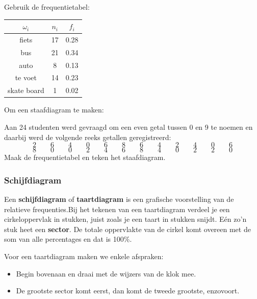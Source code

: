 \documentclass[12pt,twoside]{article}
\begin{document}
\begin{oefening}

\begin{minipage}{0.4\textwidth}
Gebruik de frequentietabel:
\begin{center}
  \begin{tabular}{c|c|c}
    $\omega_i$ & $n_i$ & $f_i$\\
    \hline
    fiets      & 17    & 0.28\\
    bus        & 21    & 0.34\\
    auto       &  8    & 0.13\\
    te voet    & 14    & 0.23\\
    skate board&  1    & 0.02
  \end{tabular}
\end{center}
\vspace*{1cm}
Om een staafdiagram te maken:
\end{minipage}
\begin{minipage}{0.6\textwidth}
\begin{center}
\end{center}
\end{minipage}
\end{oefening}

\begin{oefening}
Aan 24 studenten werd gevraagd om een even getal tussen 0 en 9 te noemen en daarbij werd de volgende reeks getallen geregistreerd:
$$2 \qquad 6 \qquad 4 \qquad 0 \qquad 6 \qquad 8 \qquad 6 \qquad 4 \qquad 2 \qquad 4 \qquad 0 \qquad 6$$
$$8 \qquad 0 \qquad 0 \qquad 2 \qquad 4 \qquad 6 \qquad 8 \qquad 4 \qquad 0 \qquad 2 \qquad 2 \qquad 0$$
Maak de frequentietabel en teken het staafdiagram.
\end{oefening}

\subsubsection{Schijfdiagram}

Een {\bf schijfdiagram} of {\bf taartdiagram} is een grafische voorstelling van de relatieve frequenties.Bij het tekenen van een taartdiagram verdeel je een cirkeloppervlak in stukken, juist zoals je een
taart in stukken snijdt. Eén zo'n stuk heet een {\bf sector}. De totale oppervlakte van de cirkel komt overeen
met de som van alle percentages en dat is 100\%.

Voor een taartdiagram maken we enkele afspraken:
\begin{itemize}
  \item Begin bovenaan en draai met de wijzers van de klok mee.
  \item De grootste sector komt eerst, dan komt de tweede
grootste, enzovoort.
\end{itemize}
\end{document}
